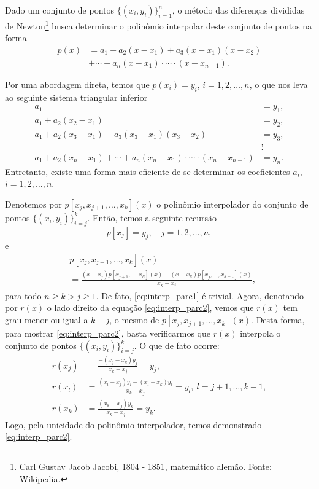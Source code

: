 Dado um conjunto de pontos $\{(x_i, y_i)\}_{i=1}^n$, o método das diferenças divididas de Newton\footnote{Carl Gustav Jacob Jacobi, 1804 - 1851, matemático alemão. Fonte: \href{https://en.wikipedia.org/wiki/Carl_Gustav_Jacob_Jacobi}{Wikipedia}.} busca determinar o polinômio interpolar deste conjunto de pontos na forma
\begin{align}
  p(x) &= a_1 + a_2(x-x_1) + a_3(x-x_1)(x-x_2)\\
       &+ \cdots + a_{n}(x-x_1)\cdot \cdots \cdot (x-x_{n-1}).
\end{align}

Por uma abordagem direta, temos que $p(x_i)=y_i$, $i=1, 2, \dotsc, n$, o que nos leva ao seguinte sistema triangular inferior
\begin{align}
  a_1 &= y_1, \\
  a_1 + a_2(x_2-x_1) &= y_2, \\
  a_1 + a_2(x_3-x_1) + a_3(x_3-x_1)(x_3-x_2) &= y_3, \\
  &\vdots\\
  a_1 + a_2(x_n-x_1) + \cdots + a_{n}(x_n-x_1)\cdot\cdots\cdot(x_n-x_{n-1}) &= y_n.
\end{align}
Entretanto, existe uma forma mais eficiente de se determinar os coeficientes $a_i$, $i=1, 2, \dotsc, n$.

Denotemos por $p[x_j, x_{j+1}, \dotsc, x_{k}](x)$ o polinômio interpolador do conjunto de pontos $\{(x_i, y_i)\}_{i=j}^k$. Então, temos a seguinte recursão
\begin{equation} \label{eq:interp_parc1}
  p[x_j] = y_j,\quad j=1, 2, \dotsc, n,
\end{equation}
e
\begin{align}
  &p[x_j, x_{j+1}, \ldots, x_k](x) \nonumber\\
  &= \frac{(x-x_j)p[x_{j+1},\dotsc,x_k](x)-(x-x_k)p[x_j,\dotsc,x_{k-1}](x)}{x_k-x_j},\label{eq:interp_parc2}
\end{align}
para todo $n\geq k > j \geq 1$. De fato, \eqref{eq:interp_parc1} é trivial. Agora, denotando por $r(x)$ o lado direito da equação \eqref{eq:interp_parc2}, vemos que $r(x)$ tem grau menor ou igual a $k-j$, o mesmo de $p[x_j, x_{j+1}, \ldots, x_k](x)$. Desta forma, para mostrar \eqref{eq:interp_parc2}, basta verificarmos que $r(x)$ interpola o conjunto de pontos $\{(x_i, y_i)\}_{i=j}^k$. O que de fato ocorre:
\begin{align}
  r(x_j) &= \frac{-(x_j-x_k)y_j}{x_k-x_j} = y_j,\\
  r(x_{l}) &= \frac{(x_l-x_j)y_l-(x_l-x_k)y_l}{x_k-x_j}=y_l,~l=j+1,\dotsc,k-1,\\
  r(x_k) &= \frac{(x_k-x_j)y_k}{x_k-x_j}=y_k.
\end{align}
Logo, pela unicidade do polinômio interpolador, temos demonstrado \eqref{eq:interp_parc2}.

